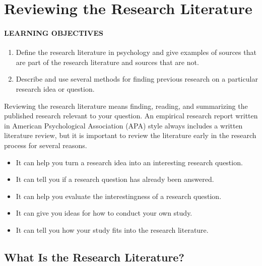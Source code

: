 \documentclass[
]{krantz}
\providecommand{\tightlist}{%
  \setlength{\itemsep}{0pt}\setlength{\parskip}{0pt}}
\begin{document}
\hypertarget{reviewing-the-research-literature}{%
\section{Reviewing the Research Literature}\label{reviewing-the-research-literature}}

\hypertarget{learning-objectives-31}{%
\paragraph*{LEARNING OBJECTIVES}\label{learning-objectives-31}}

\begin{enumerate}
\def\labelenumi{\arabic{enumi}.}
\tightlist
\item
  Define the research literature in psychology and give examples of sources that are part of the research literature and sources that are not.
\item
  Describe and use several methods for finding previous research on a particular research idea or question.
\end{enumerate}

Reviewing the research literature means finding, reading, and summarizing the published research relevant to your question. An empirical research report written in American Psychological Association (APA) style always includes a written literature review, but it is important to review the literature early in the research process for several reasons.

\begin{itemize}
\tightlist
\item
  It can help you turn a research idea into an interesting research question.
\item
  It can tell you if a research question has already been answered.
\item
  It can help you evaluate the interestingness of a research question.
\item
  It can give you ideas for how to conduct your own study.
\item
  It can tell you how your study fits into the research literature.
\end{itemize}

\hypertarget{what-is-the-research-literature}{%
\subsection*{What Is the Research Literature?}\label{what-is-the-research-literature}}
\end{document}
